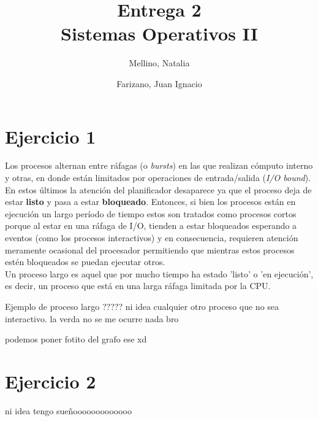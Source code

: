 \documentclass[11pt]{article}
\title{
    Entrega 2 \\
    \large Sistemas Operativos II}
\author{Mellino, Natalia \and Farizano, Juan Ignacio}
\date{}
\begin{document}
\maketitle


\section*{Ejercicio 1}

Los procesos alternan entre ráfagas (o \emph{bursts}) en las que realizan cómputo interno
y otras, en donde están limitados por operaciones de entrada/salida (\emph{I/O bound}). 
En estos últimos la atención del planificador desaparece ya que el proceso deja de
estar \textbf{listo} y pasa a estar \textbf{bloqueado}. Entonces, si bien los procesos están en ejecución un largo período de tiempo estos
son tratados como procesos cortos porque al estar en una ráfaga de I/O, tienden
a estar bloqueados esperando a eventos (como los procesos interactivos) y en consecuencia,
requieren atención meramente ocasional del procesador permitiendo que mientras estos
procesos estén bloqueados se puedan ejecutar otros. \\ %

Un proceso largo es aquel que por mucho tiempo ha estado 'listo' o 'en ejecución', es decir,
un proceso que está en una larga ráfaga limitada por la CPU.

Ejemplo de proceso largo ????? ni idea
cualquier otro proceso que no sea interactivo. la verda no se me ocurre nada bro

podemos poner fotito del grafo ese xd

\section*{Ejercicio 2}

ni idea tengo sueñooooooooooooo
\end{document}
